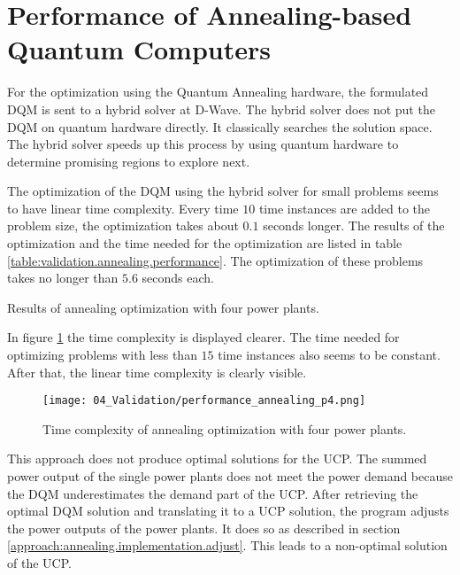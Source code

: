 \section{Performance of Annealing-based Quantum Computers}

For the optimization using the Quantum Annealing hardware, the formulated DQM is sent to a hybrid solver at D-Wave.
The hybrid solver does not put the DQM on quantum hardware directly.
It classically searches the solution space.
The hybrid solver speeds up this process by using quantum hardware to determine promising regions to explore next.
\cite{DQMHybrid2020}

The optimization of the DQM using the hybrid solver for small problems seems to have linear time complexity.
Every time $10$ time instances are added to the problem size, the optimization takes about $0.1$ seconds longer.
The results of the optimization and the time needed for the optimization are listed in table \ref{table:validation.annealing.performance}.
The optimization of these problems takes no longer than $5.6$ seconds each.


\begin{table}[ht]
  \centering
  
  \caption{Results of annealing optimization with four power plants.}
  \label{table:validation.annealing.performance}
\end{table}

In figure \ref{figure:validation.annealing.performance} the time complexity is displayed clearer.
The time needed for optimizing problems with less than $15$ time instances also seems to be constant.
After that, the linear time complexity is clearly visible.

\begin{figure}[ht]
  \centering
  \texttt{[image: 04\_Validation/performance\_annealing\_p4.png]}
  \caption{Time complexity of annealing optimization with four power plants.}
  \label{figure:validation.annealing.performance}
\end{figure}

This approach does not produce optimal solutions for the UCP.
The summed power output of the single power plants does not meet the power demand because the DQM underestimates the demand part of the UCP.
After retrieving the optimal DQM solution and translating it to a UCP solution, the program adjusts the power outputs of the power plants.
It does so as described in section \ref{approach:annealing.implementation.adjust}.
This leads to a non-optimal solution of the UCP.
